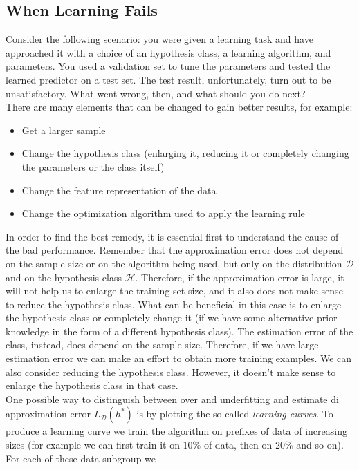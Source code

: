 \documentclass[12pt]{report}
\theoremstyle{plain}
\newcommand\mcl[1]{\mathcal{#1}}
\begin{document}
\begin{flushleft}
\section{When Learning Fails}
Consider the following scenario: you were given a learning task and have 
approached it with a choice of an hypothesis class, a learning algorithm, and 
parameters. You used a validation set to tune the parameters and tested the 
learned predictor on a test set. The test result, unfortunately, turn out to be 
unsatisfactory. What went wrong, then, and what should you do next?\\
There are many elements that can be changed to gain better results, for example:
\begin{itemize}
	\item Get a larger sample
	\item Change the hypothesis class (enlarging it, reducing it or completely 
	changing the parameters or the class itself)
	\item Change the feature representation of the data
	\item Change the optimization algorithm used to apply the learning rule
\end{itemize}
In order to find the best remedy, it is essential first to understand the cause 
of the bad performance. Remember that the approximation error does not depend 
on the sample size or on the algorithm being used, but only on the distribution 
$\mcl{D}$ and on the hypothesis class $\mcl{H}$. Therefore, if the 
approximation error is large, it will not help us to enlarge the training set 
size, and it also does not make sense to reduce the hypothesis class. What can 
be beneficial in this case is to enlarge the hypothesis class or completely 
change it (if we have some alternative prior knowledge in the form of a 
different hypothesis class). The estimation error of the class, instead, does 
depend on the sample size. Therefore, if we have large estimation error we can 
make an effort to obtain more training examples. We can also consider reducing 
the hypothesis class. However, it doesn't make sense to enlarge the hypothesis 
class in that case.\\
One possible way to distinguish between over and underfitting and estimate di 
approximation error $L_\mcl{D}(h^*)$ is by plotting the so called 
\textit{learning curves}. To produce a learning curve we train the algorithm on 
prefixes of data of increasing sizes (for example we can first train it on 
$10\%$ of data, then on $20\%$ and so on). For each of these data subgroup we 

\end{flushleft}
\end{document}
